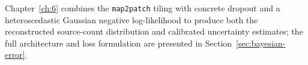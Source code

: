 Chapter~\ref{ch:6} combines the \texttt{map2patch} tiling with concrete dropout and a heteroscedastic Gaussian negative log-likelihood to produce both the reconstructed source-count distribution and calibrated uncertainty estimates; the full architecture and loss formulation are presented in Section~\ref{sec:bayesian-error}.

% 
% 
